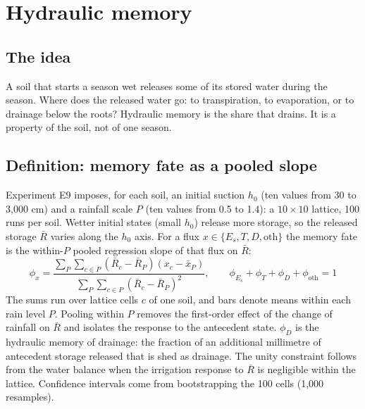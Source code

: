 \chapter{Hydraulic memory}\label{ch:mem}

\section{The idea}
A soil that starts a season wet releases some of its stored water during the season. Where does the released water go: to transpiration, to evaporation, or to drainage below the roots? Hydraulic memory is the share that drains. It is a property of the soil, not of one season.

\section{Definition: memory fate as a pooled slope}
Experiment E9 imposes, for each soil, an initial suction $h_0$ (ten values from 30 to 3,000 cm) and a rainfall scale $P$ (ten values from 0.5 to 1.4): a $10\times10$ lattice, 100 runs per soil. Wetter initial states (small $h_0$) release more storage, so the released storage $\bar R$ varies along the $h_0$ axis. For a flux $x\in\{E_s,T,D,\mathrm{oth}\}$ the memory fate is the within-$P$ pooled regression slope of that flux on $\bar R$:
\begin{equation}\label{eq:phi}
\boxed{\;\phi_x=\frac{\sum_P\sum_{c\in P}(\bar R_c-\bar R_P)(x_c-\bar x_P)}{\sum_P\sum_{c\in P}(\bar R_c-\bar R_P)^2},\qquad\phi_{E_s}+\phi_T+\phi_D+\phi_{\mathrm{oth}}=1\;}
\end{equation}
The sums run over lattice cells $c$ of one soil, and bars denote means within each rain level $P$. Pooling within $P$ removes the first-order effect of the change of rainfall on $\bar R$ and isolates the response to the antecedent state. $\phi_D$ is the hydraulic memory of drainage: the fraction of an additional millimetre of antecedent storage released that is shed as drainage. The unity constraint follows from the water balance when the irrigation response to $\bar R$ is negligible within the lattice. Confidence intervals come from bootstrapping the 100 cells (1,000 resamples).




